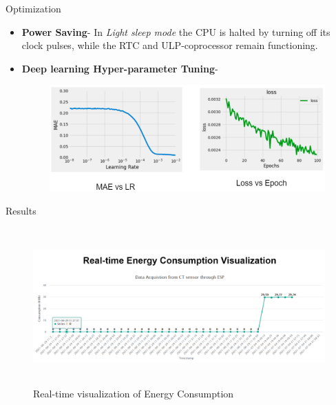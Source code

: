 \documentclass[11pt, aspect ratio=169]{beamer}
\begin{document}
\begin{frame}{Optimization}
\begin{itemize}
    \item \textbf{{Power Saving}}-
    In \textit{Light sleep mode} the CPU is halted by turning off its clock pulses, while the RTC and ULP-coprocessor remain functioning.
    \item \textbf{{Deep learning Hyper-parameter Tuning}}-
    \begin{figure}[h!]
    \centering
    \includegraphics[width=10cm=\textwidth]{images/hyper.png}
    \end{figure}
    
\end{itemize}
\end{frame}

\begin{frame}{Results}
     \begin{figure}[H]%
\begin {center}
\includegraphics[width=12cm,height=6cm]{images/dashboard.png}
\caption{Real-time visualization of Energy Consumption}
\end {center}
\end{figure}
\end{frame}
\end{document}

